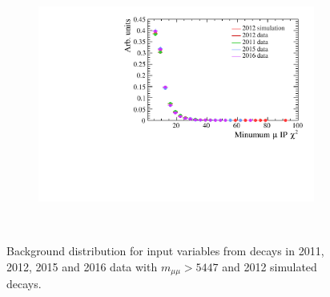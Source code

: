 \begin{figure}
 \begin{subfigure}[b]{0.48\textwidth}
        \includegraphics[width=\textwidth]{./Figs/Selection/bkgnd_muIPS.pdf}
        \caption{ }
        \label{fig:BDTsig}
    \end{subfigure}
    ~ %
 



    \caption{Background distribution for input variables from \bbbarmumux decays in 2011, 2012, 2015 and 2016 data with $m_{\mu \mu} > 5447$ \mevcc and 2012 simulated \bbbarmumux decays.}
    \label{fig:signalvars}
\end{figure}
